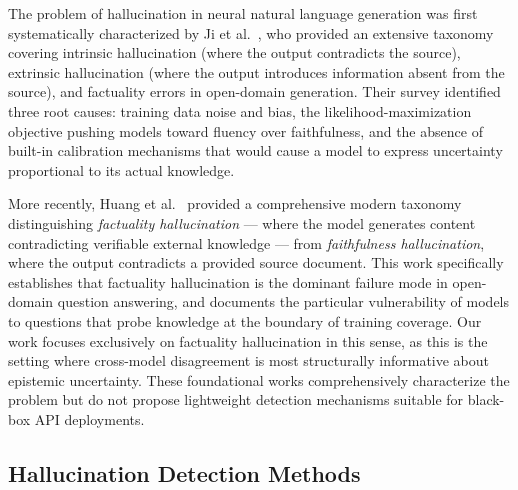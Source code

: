 \documentclass[journal]{IEEEtran}
\begin{document}
The problem of hallucination in neural natural language generation was
first systematically characterized by Ji et al.~\cite{ji2023survey}, who
provided an extensive taxonomy covering intrinsic hallucination (where the
output contradicts the source), extrinsic hallucination (where the output
introduces information absent from the source), and factuality errors in
open-domain generation.
Their survey identified three root causes: training data noise and bias,
the likelihood-maximization objective pushing models toward fluency over
faithfulness, and the absence of built-in calibration mechanisms that
would cause a model to express uncertainty proportional to its actual
knowledge.

More recently, Huang et al.~\cite{huang2024hallucination} provided a
comprehensive modern taxonomy distinguishing \emph{factuality hallucination}
--- where the model generates content contradicting verifiable external
knowledge --- from \emph{faithfulness hallucination}, where the output
contradicts a provided source document.
This work specifically establishes that factuality hallucination is the
dominant failure mode in open-domain question answering, and documents the
particular vulnerability of models to questions that probe knowledge at the
boundary of training coverage.
Our work focuses exclusively on factuality hallucination in this sense, as
this is the setting where cross-model disagreement is most structurally
informative about epistemic uncertainty.
These foundational works comprehensively characterize the problem but do
not propose lightweight detection mechanisms suitable for black-box API
deployments.

\subsection{Hallucination Detection Methods}
\end{document}
